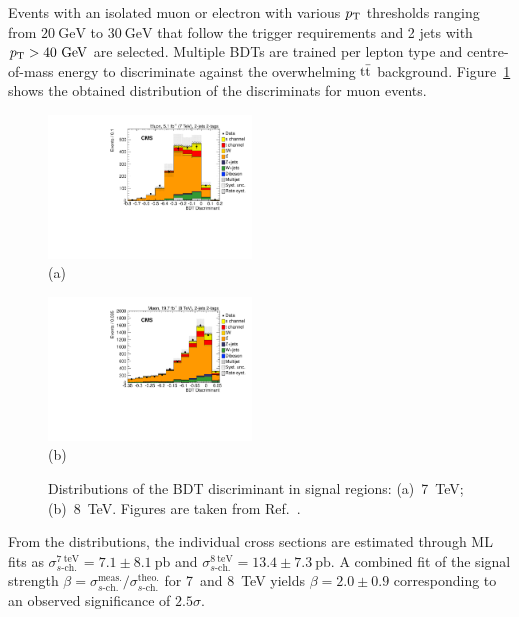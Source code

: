 \documentclass{PoS}
\begin{document}
Events with an isolated muon or electron with various $p_\mathrm{T}$ thresholds ranging from $20~\mathrm{GeV}$ to $30~\mathrm{GeV}$ that follow the trigger requirements and 2 jets with $p_\mathrm{T}>40~\mathrm{GeV}$ are selected. Multiple BDTs are trained per lepton type and centre-of-mass energy to discriminate against the overwhelming $\mathrm{t}\bar{\mathrm{t}}$ background. Figure~\ref{fig:schannel-BDT} shows the obtained distribution of the discriminats for muon events.

\begin{figure}[htbp]
\begin{center}
\parbox[t]{0.49\textwidth}{\centering\includegraphics[width=0.48\textwidth]{figures/schannel/mu_7TeV_BDT_signal.pdf}\\(a)}
\parbox[t]{0.49\textwidth}{\centering\includegraphics[width=0.48\textwidth]{figures/schannel/mu_8TeV_BDT_signal.pdf}\\(b)}
\caption{\label{fig:schannel-BDT}Distributions of the BDT discriminant in signal regions: (a)~7~TeV; (b)~8~TeV. Figures are taken from Ref.~\cite{CMS-PAS-TOP-13-009}.}
\end{center}
\end{figure}

From the distributions, the individual cross sections are estimated through ML fits as $\sigma^\mathrm{7~teV}_{s\mbox{-}\mathrm{ch.}}=7.1\pm8.1~\mathrm{pb}$ and $\sigma^\mathrm{8~teV}_{s\mbox{-}\mathrm{ch.}}=13.4\pm7.3~\mathrm{pb}$. A combined fit of the signal strength $\beta=\sigma^\mathrm{meas.}_{s\mbox{-}\mathrm{ch.}}/\sigma^\mathrm{theo.}_{s\mbox{-}\mathrm{ch.}}$ for 7~and 8~TeV yields $\beta=2.0\pm0.9$ corresponding to an observed significance of $2.5\sigma$.
\end{document}
